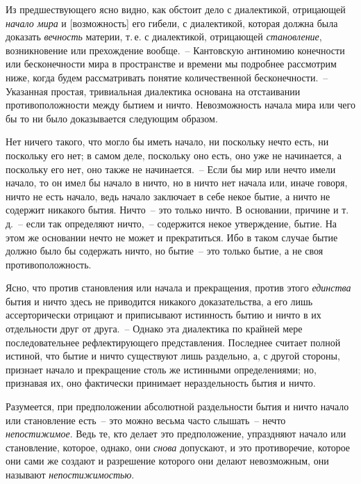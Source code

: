 Из предшествующего ясно видно, как обстоит дело с
диалектикой, отрицающей \emph{начало мира} и [возможность]
его гибели, с диалектикой, которая должна была доказать
\emph{вечность} материи, т.\,е. с диалектикой, отрицающей \emph{становление},
возникновение или прехождение вообще.~--
Кантовскую антиномию конечности или бесконечности
мира в пространстве и времени мы подробнее рассмотрим
ниже, когда будем рассматривать понятие количественной
бесконечности.~-- Указанная простая, тривиальная диалектика
основана на отстаивании противоположности
между бытием и ничто. Невозможность начала мира или
чего бы то ни было доказывается следующим образом.

Нет ничего такого, что могло бы иметь начало, ни поскольку
нечто есть, ни поскольку его нет; в самом деле,
поскольку оно есть, оно уже не начинается, а поскольку
его нет, оно также не начинается.~-- Если бы мир или нечто
имели начало, то он имел бы начало в ничто, но в
ничто нет начала или, иначе говоря, ничто не есть начало,
ведь начало заключает в себе некое бытие, а ничто не
содержит никакого бытия. Ничто~-- это только ничто.
В основании, причине и т.\,д.~-- если так определяют ничто,~--
содержится некое утверждение, бытие. На этом же
основании нечто не может и прекратиться. Ибо в таком
случае бытие должно было бы содержать ничто, но бытие~--
это только бытие, а не своя противоположность.

Ясно, что против становления или начала и прекращения,
против этого \emph{единства} бытия и ничто здесь не
приводится никакого доказательства, а его лишь ассерторически
отрицают и приписывают истинность бытию и
ничто в их отдельности друг от друга.~-- Однако эта диалектика
по крайней мере последовательнее рефлектирующего
представления. Последнее считает полной истиной,
что бытие и ничто существуют лишь раздельно, а, с
другой стороны, признает начало и прекращение столь
же истинными определениями; но, признавая их, оно
фактически принимает нераздельность бытия и ничто.

Разумеется, при предположении абсолютной раздельности
бытия и ничто начало или становление есть~--
это можно весьма часто слышать~-- нечто \emph{непостижимое}.
Ведь те, кто делает это предположение, упраздняют начало
или становление, которое, однако, они \emph{снова} допускают,
и это противоречие, которое они сами же создают
и разрешение которого они делают невозможным, они называют
\emph{непостижимостью}.

